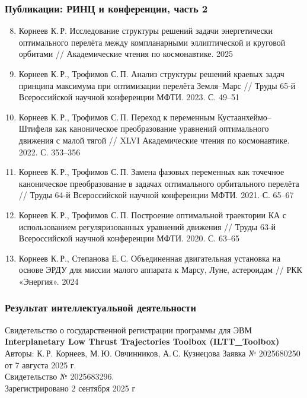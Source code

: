 \begin{frame}
    \frametitle{Публикации: РИНЦ и конференции, часть 2}
    \scriptsize
    \begin{enumerate}
        \setcounter{enumi}{7}
        \item Корнеев К.\,Р. Исследование структуры решений задачи энергетически оптимального перелёта между компланарными эллиптической и круговой орбитами // Академические чтения по космонавтике. 2025
        \item Корнеев К.\,Р., Трофимов С.\,П. Анализ структуры решений краевых задач принципа максимума при оптимизации перелёта Земля--Марс // Труды 65-й Всероссийской научной конференции МФТИ. 2023. С. 49--51
        \item Корнеев К.\,Р., Трофимов С.\,П. Переход к переменным Кустаанхеймо--Штифеля как каноническое преобразование уравнений оптимального движения с малой тягой // XLVI Академические чтения по космонавтике. 2022. С. 353--356
        \item Корнеев К.\,Р., Трофимов С.\,П. Замена фазовых переменных как точечное каноническое преобразование в задачах оптимального орбитального перелёта // Труды 64-й Всероссийской научной конференции МФТИ. 2021. С. 65--67
        \item Корнеев К.\,Р., Трофимов С.\,П. Построение оптимальной траектории КА с использованием регуляризованных уравнений движения // Труды 63-й Всероссийской научной конференции МФТИ. 2020. С. 63--65
        \item Корнеев К.\,Р., Степанова Е.\,С. Объединенная двигательная установка на основе ЭРДУ для миссии малого аппарата к Марсу, Луне, астероидам // РКК «Энергия». 2024
    \end{enumerate}
\end{frame}
\begin{frame}
    \frametitle{Результат интеллектуальной деятельности}
    \begin{block}{Свидетельство о государственной регистрации программы для ЭВМ}
        \textbf{Interplanetary Low Thrust Trajectories Toolbox (ILTT\_Toolbox)}
        \medskip
        Авторы: К.\,Р. Корнеев, М.\,Ю. Овчинников, А.\,С. Кузнецова
        \medskip
        Заявка № 2025680250 от 7 августа 2025 г.\\
        Свидетельство № 2025683296.\\
        Зарегистрировано 2 сентября 2025 г
    \end{block}
\end{frame}
